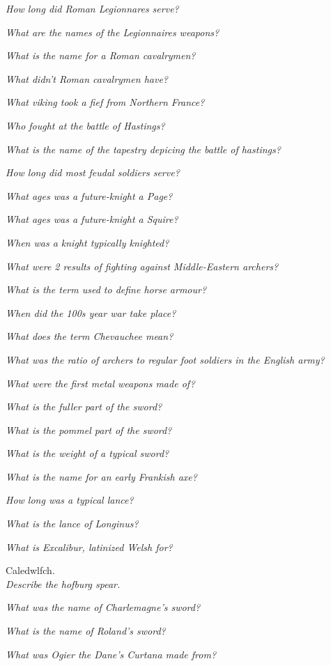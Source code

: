 \documentclass[12pt]{article}
\begin{document}
\textit{How long did Roman Legionnares serve?}

\textit{What are the names of the Legionnaires weapons?}

\textit{What is the name for a Roman cavalrymen?}

\textit{What didn't Roman cavalrymen have?}

\textit{What viking took a fief from Northern France?}

\textit{Who fought at the battle of Hastings?}

\textit{What is the name of the tapestry depicing the battle of hastings?}

\textit{How long did most feudal soldiers serve?}

\textit{What ages was a future-knight a Page?}

\textit{What ages was a future-knight a Squire?}

\textit{When was a knight typically knighted?}

\textit{What were 2 results of fighting against Middle-Eastern archers?}

\textit{What is the term used to define horse armour?}

\textit{When did the 100s year war take place?}

\textit{What does the term Chevauchee mean?}

\textit{What was the ratio of archers to regular foot soldiers in the English army?}

\textit{What were the first metal weapons made of?}

\textit{What is the fuller part of the sword?}

\textit{What is the pommel part of the sword?}

\textit{What is the weight of a typical sword?}

\textit{What is the name for an early Frankish axe?}

\textit{How long was a typical lance?}

\textit{What is the lance of Longinus?}

\textit{What is Excalibur, latinized Welsh for?}

Caledwlfch.\\

\textit{Describe the hofburg spear.}

\textit{What was the name of Charlemagne's sword?}

\textit{What is the name of Roland's sword?}

\textit{What was Ogier the Dane's Curtana made from?}
\end{document}
